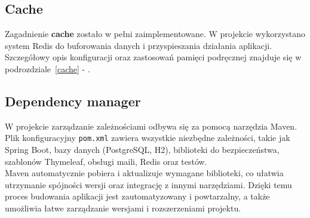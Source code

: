 \documentclass[12pt]{article}
\begin{document}
	\subsection{Cache}
	Zagadnienie \textbf{cache} zostało w pełni zaimplementowane. W projekcie wykorzystano system Redis do buforowania danych i przyspieszania działania aplikacji. Szczegółowy opis konfiguracji oraz zastosowań pamięci podręcznej znajduje się w podrozdziale~\ref{cache} - .
	
	\subsection{Dependency manager}
	W projekcie zarządzanie zależnościami odbywa się za pomocą narzędzia Maven. Plik konfiguracyjny \texttt{pom.xml} zawiera wszystkie niezbędne zależności, takie jak Spring Boot, bazy danych (PostgreSQL, H2), biblioteki do bezpieczeństwa, szablonów Thymeleaf, obsługi maili, Redis oraz testów.\\
	Maven automatycznie pobiera i aktualizuje wymagane biblioteki, co ułatwia utrzymanie spójności wersji oraz integrację z innymi narzędziami. Dzięki temu proces budowania aplikacji jest zautomatyzowany i powtarzalny, a także umożliwia łatwe zarządzanie wersjami i rozszerzeniami projektu.
	
\end{document}
